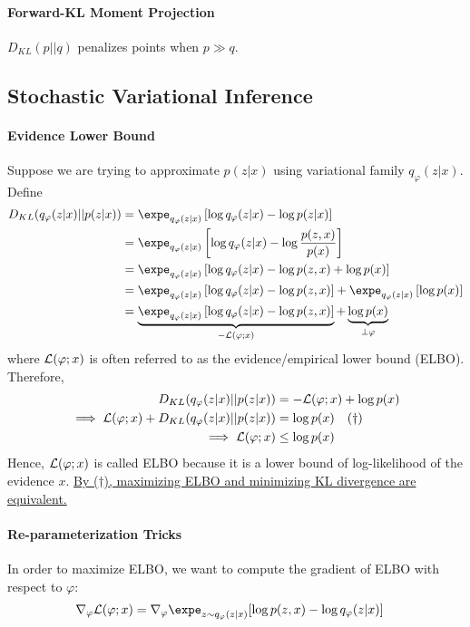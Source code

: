 \documentclass{article}
\begin{document}
	\paragraph{Forward-KL Moment Projection} $D_{KL}(p||q)$ penalizes points when $p \gg q$.
	
	\subsection{Stochastic Variational Inference}
	\paragraph{Evidence Lower Bound} Suppose we are trying to approximate $p(z|x)$ using variational family $q_\varphi(z|x)$. Define
	\begin{align}
		D_{KL}(q_\varphi(z|x) || p(z|x)) 
		&= \expe_{q_\varphi(z|x)} \left[
		\log q_\varphi(z|x) - \log p(z|x)
		\right] \\
		&= \expe_{q_\varphi(z|x)} \left[
		\log q_\varphi(z|x) - \log \frac{p(z, x)}{p(x)}
		\right] \\
		&= \expe_{q_\varphi(z|x)} \left[
		\log q_\varphi(z|x) - \log p(z, x) + \log p(x)
		\right] \\
		&= \expe_{q_\varphi(z|x)} \left[
		\log q_\varphi(z|x) - \log p(z, x) \right]
		+ \expe_{q_\varphi(z|x)} \left[ \log p(x)
		\right] \\
		&= \underbrace{\expe_{q_\varphi(z|x)} \left[
		\log q_\varphi(z|x) - \log p(z, x) \right]}_{-\mc{L}(\varphi;x)}
		+ \underbrace{\log p(x)}_{\perp \varphi}
	\end{align}
	where $\mathcal{{L}}(\varphi; x)$ is often referred to as the evidence/empirical lower bound (ELBO). Therefore,
	\begin{align}
		D_{KL}(q_\varphi(z|x) || p(z|x)) &= - \mathcal{{L}}(\varphi;x) + \log p(x) \\
		\implies \mathcal{{L}}(\varphi;x) + D_{KL}(q_\varphi(z|x) || p(z|x)) &= \log p(x)\quad (\dagger) \\
		\implies \mathcal{{L}}(\varphi; x) &\leq \log p(x)
	\end{align}
	Hence, $\mathcal{{L}}(\varphi; x)$ is called ELBO because it is a lower bound of log-likelihood of the evidence $x$. \ul{By ($\dagger$), maximizing ELBO and minimizing KL divergence are equivalent.}
	
	\paragraph{Re-parameterization Tricks} In order to maximize ELBO, we want to compute the gradient of ELBO with respect to $\varphi$:
	\begin{align}
		\nabla_\varphi \mc{L}(\varphi; x)
		&= \nabla_\varphi \expe_{z \sim q_\varphi(z|x)} [
		\log p(z, x) - \log q_\varphi(z|x)]
	\end{align}
	
\end{document}
